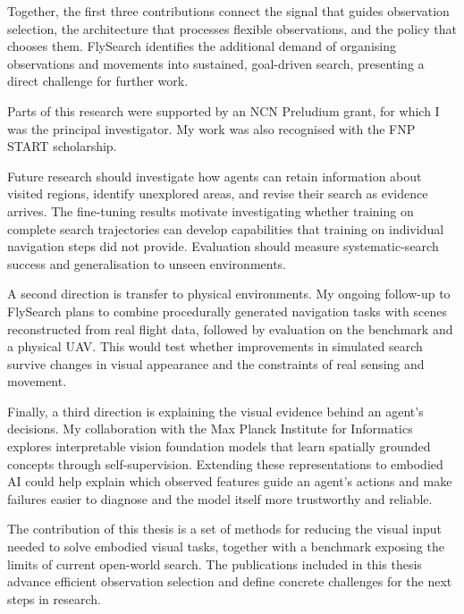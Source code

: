 Together, the first three contributions connect the signal that guides observation selection, the architecture that processes flexible observations, and the policy that chooses them. FlySearch identifies the additional demand of organising observations and movements into sustained, goal-driven search, presenting a direct challenge for further work.

Parts of this research were supported by an NCN Preludium grant, for which I was the principal investigator. My work was also recognised with the FNP START scholarship.

Future research should investigate how agents can retain information about visited regions, identify unexplored areas, and revise their search as evidence arrives. The fine-tuning results motivate investigating whether training on complete search trajectories can develop capabilities that training on individual navigation steps did not provide. Evaluation should measure systematic-search success and generalisation to unseen environments.

A second direction is transfer to physical environments. My ongoing follow-up to FlySearch plans to combine procedurally generated navigation tasks with scenes reconstructed from real flight data, followed by evaluation on the benchmark and a physical UAV. This would test whether improvements in simulated search survive changes in visual appearance and the constraints of real sensing and movement.

Finally, a third direction is explaining the visual evidence behind an agent's decisions. My collaboration with the Max Planck Institute for Informatics explores interpretable vision foundation models that learn spatially grounded concepts through self-supervision. Extending these representations to embodied AI could help explain which observed features guide an agent's actions and make failures easier to diagnose and the model itself more trustworthy and reliable.

The contribution of this thesis is a set of methods for reducing the visual input needed to solve embodied visual tasks, together with a benchmark exposing the limits of current open-world search. The publications included in this thesis advance efficient observation selection and define concrete challenges for the next steps in research.